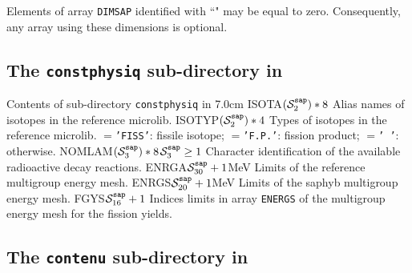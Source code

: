 \vskip 0.1cm

Elements of array {\tt DIMSAP} identified with ``{\tt *}" may be equal to zero. Consequently,
any array using these dimensions is optional.

\clearpage

\subsection{The {\tt constphysiq} sub-directory in }\label{sect:sapdircons}

\vskip -0.5cm

\begin{DescriptionEnregistrement}{Contents of sub-directory {\tt constphysiq} in }{7.0cm}
\CharEnr
  {ISOTA}{$(\mathcal{S}^{\tt sap}_2)*8$}
  {Alias names of isotopes in the reference {\sc microlib}.}
\CharEnr
  {ISOTYP}{$(\mathcal{S}^{\tt sap}_2)*4$}
  {Types of isotopes in the reference {\sc microlib}. $=${\tt 'FISS'}: fissile isotope;
  $=${\tt 'F.P.'}: fission product; $=${\tt '~'}: otherwise.}
\OptCharEnr
  {NOMLAM}{$(\mathcal{S}^{\tt sap}_3)*8$}{$\mathcal{S}^{\tt sap}_3\ge 1$}
  {Character identification of the available radioactive decay reactions.}
\RealEnr
  {ENRGA}{$\mathcal{S}^{\tt sap}_{30}+1$}{MeV}
  {Limits of the reference multigroup energy mesh.}
\RealEnr
  {ENRGS}{$\mathcal{S}^{\tt sap}_{20}+1$}{MeV}
  {Limits of the {\sc saphyb} multigroup energy mesh.}
\IntEnr
  {FGYS}{$\mathcal{S}^{\tt sap}_{16}+1$}
  {Indices limits in array {\tt ENERGS} of the  multigroup energy mesh for the fission yields.}
\end{DescriptionEnregistrement}

\subsection{The {\tt contenu} sub-directory in }\label{sect:sapdircont}

\vskip -0.5cm

